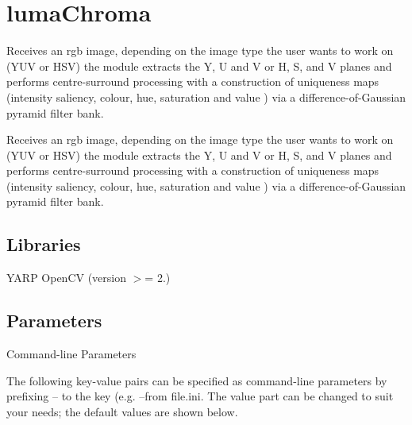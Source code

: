 \section{luma\+Chroma}
\label{group__lumaChroma}


Receives an rgb image, depending on the image type the user wants to work on (Y\+UV or H\+SV) the module extracts the Y, U and V or H, S, and V planes and performs centre-\/surround processing with a construction of uniqueness maps (intensity saliency, colour, hue, saturation and value ) via a difference-\/of-\/\+Gaussian pyramid filter bank.  


Receives an rgb image, depending on the image type the user wants to work on (Y\+UV or H\+SV) the module extracts the Y, U and V or H, S, and V planes and performs centre-\/surround processing with a construction of uniqueness maps (intensity saliency, colour, hue, saturation and value ) via a difference-\/of-\/\+Gaussian pyramid filter bank. 

\hypertarget{group__blobExtractor_lib_sec}{}\subsection{Libraries}\label{group__blobExtractor_lib_sec}
Y\+A\+RP Open\+CV (version $>$= 2.)\hypertarget{group__seg2cloud_parameters_sec}{}\subsection{Parameters}\label{group__seg2cloud_parameters_sec}
Command-\/line Parameters

The following key-\/value pairs can be specified as command-\/line parameters by prefixing {\ttfamily --} to the key (e.\+g. {\ttfamily --from} file.\+ini. The value part can be changed to suit your needs; the default values are shown below.


